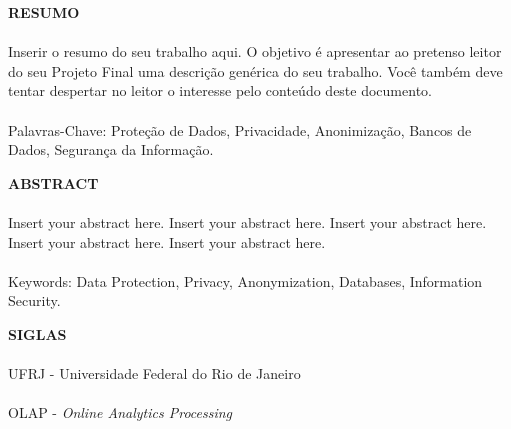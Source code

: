 \pagebreak


\begin{center}
\textbf{RESUMO}
\end{center}
      \vspace{0.5cm}

\paragraph{}Inserir o resumo do seu trabalho aqui. O objetivo é apresentar ao pretenso leitor do seu Projeto Final uma descrição genérica do seu trabalho. Você também deve tentar despertar no leitor o interesse pelo conteúdo deste documento.
\paragraph{}
\noindent Palavras-Chave: Proteção de Dados, Privacidade, Anonimização, Bancos de Dados, Segurança da Informação.

\pagebreak


\begin{center}
\textbf{ABSTRACT}
\end{center}
      \vspace{0.5cm}

\paragraph{}Insert your abstract here. Insert your abstract here. Insert your abstract here. Insert your abstract here. Insert your abstract here.
\paragraph{}
\noindent Keywords: Data Protection, Privacy, Anonymization, Databases, Information Security.

\pagebreak


\begin{center}
\textbf{SIGLAS}
\end{center}
      \vspace{0.5cm}

\paragraph{}UFRJ - Universidade Federal do Rio de Janeiro 
\paragraph{}OLAP - \textit{Online Analytics Processing}
